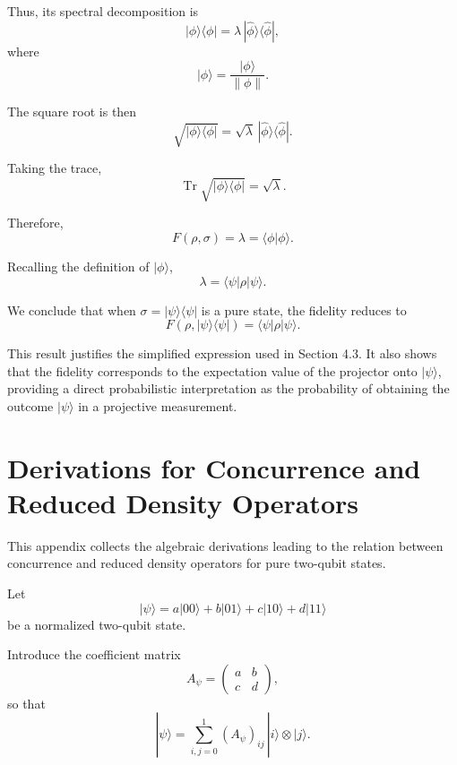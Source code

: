 \documentclass[a4paper]{article}
\begin{document}
Thus, its spectral decomposition is
\[
|\phi\rangle\langle\phi|
=
\lambda\,|\hat{\phi}\rangle\langle\hat{\phi}|,
\]
where
\[
|\hat{\phi}\rangle = \frac{|\phi\rangle}{\|\phi\|}.
\]

The square root is then
\[
\sqrt{|\phi\rangle\langle\phi|}
=
\sqrt{\lambda}\,|\hat{\phi}\rangle\langle\hat{\phi}|.
\]

Taking the trace,
\[
\operatorname{Tr}\sqrt{|\phi\rangle\langle\phi|}
=
\sqrt{\lambda}.
\]

Therefore,
\[
F(\rho,\sigma)
=
\lambda
=
\langle \phi | \phi \rangle.
\]

Recalling the definition of $|\phi\rangle$,
\[
\lambda
=
\langle \psi | \rho | \psi \rangle.
\]

\medskip

We conclude that when $\sigma = |\psi\rangle\langle\psi|$ is a pure state, the fidelity reduces to
\[
F(\rho,|\psi\rangle\langle\psi|)
=
\langle \psi | \rho | \psi \rangle.
\]

\medskip

This result justifies the simplified expression used in Section 4.3. It also shows that the fidelity corresponds to the expectation value of the projector onto $|\psi\rangle$, providing a direct probabilistic interpretation as the probability of obtaining the outcome $|\psi\rangle$ in a projective measurement.



\section{Derivations for Concurrence and Reduced Density Operators}

This appendix collects the algebraic derivations leading to the relation between concurrence and reduced density operators for pure two-qubit states.

Let
\[
|\psi\rangle
=
a|00\rangle + b|01\rangle + c|10\rangle + d|11\rangle
\]
be a normalized two-qubit state.

Introduce the coefficient matrix
\[
A_\psi =
\begin{pmatrix}
a & b\\
c & d
\end{pmatrix},
\]
so that
\[
|\psi\rangle
=
\sum_{i,j=0}^{1} (A_\psi)_{ij}\,|i\rangle \otimes |j\rangle.
\]
\end{document}
